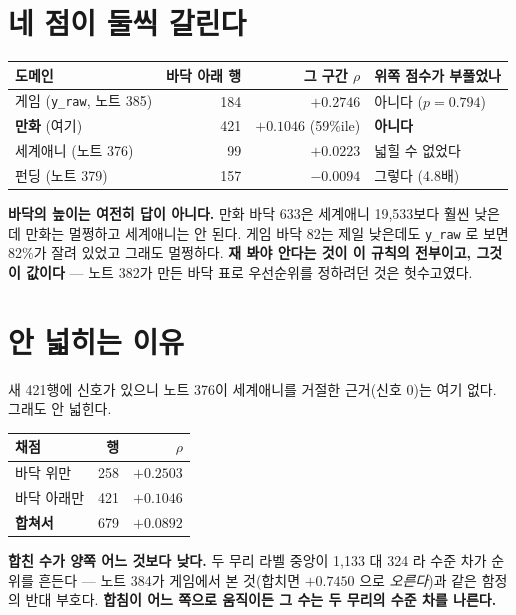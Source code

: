 \documentclass[11pt]{article}
\begin{document}
\section{네 점이 둘씩 갈린다}

\begin{center}
\begin{tabular}{lrrl}
\hline
도메인 & 바닥 아래 행 & 그 구간 $\rho$ & 위쪽 점수가 부풀었나 \\
\hline
게임 (\texttt{y\_raw}, 노트 385) & 184 & $+0.2746$ & 아니다 ($p=0.794$) \\
\textbf{만화} (여기) & 421 & $\mathbf{+0.1046}$ (59\%ile) & \textbf{아니다} \\
세계애니 (노트 376) & 99 & $+0.0223$ & 넓힐 수 없었다 \\
펀딩 (노트 379) & 157 & $-0.0094$ & 그렇다 (4.8배) \\
\hline
\end{tabular}
\end{center}

\textbf{바닥의 높이는 여전히 답이 아니다.} 만화 바닥 633은 세계애니
19,533보다 훨씬 낮은데 만화는 멀쩡하고 세계애니는 안 된다. 게임 바닥
82는 제일 낮은데도 \texttt{y\_raw} 로 보면 82\%가 잘려 있었고 그래도
멀쩡하다. \textbf{재 봐야 안다는 것이 이 규칙의 전부이고, 그것이 값이다}
--- 노트 382가 만든 바닥 표로 우선순위를 정하려던 것은 헛수고였다.

\section{안 넓히는 이유}

새 421행에 신호가 있으니 노트 376이 세계애니를 거절한 근거(신호 0)는
여기 없다. 그래도 안 넓힌다.

\begin{center}
\begin{tabular}{lrr}
\hline
채점 & 행 & $\rho$ \\
\hline
바닥 위만 & 258 & $+0.2503$ \\
바닥 아래만 & 421 & $+0.1046$ \\
\textbf{합쳐서} & 679 & $\mathbf{+0.0892}$ \\
\hline
\end{tabular}
\end{center}

\textbf{합친 수가 양쪽 어느 것보다 낮다.} 두 무리 라벨 중앙이 1,133 대
324 라 수준 차가 순위를 흔든다 --- 노트 384가 게임에서 본 것(합치면
$+0.7450$ 으로 \emph{오른다})과 같은 함정의 반대 부호다. \textbf{합침이
어느 쪽으로 움직이든 그 수는 두 무리의 수준 차를 나른다.}
\end{document}
